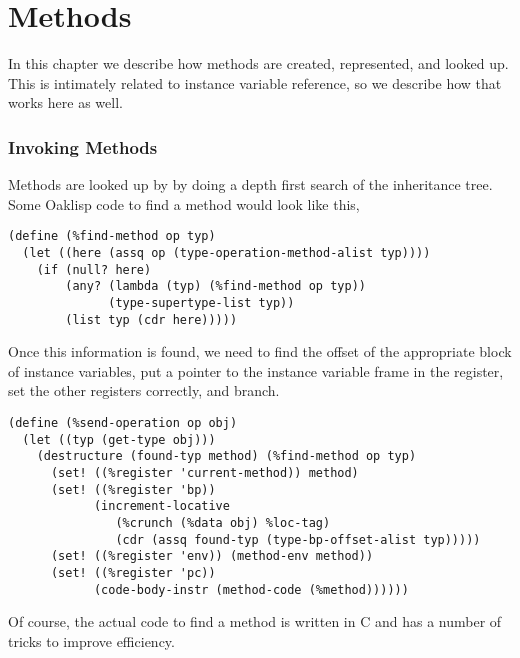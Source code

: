 \chapter{Methods}

In this chapter we describe how methods are created, represented, and
looked up.  This is intimately related to instance variable reference,
so we describe how that works here as well.

\subsection{Invoking Methods}

Methods are looked up by by doing a depth first search of the
inheritance tree.  Some Oaklisp code to find a method would look like
this,
\begin{verbatim}
(define (%find-method op typ)
  (let ((here (assq op (type-operation-method-alist typ))))
    (if (null? here)
        (any? (lambda (typ) (%find-method op typ))
              (type-supertype-list typ))
        (list typ (cdr here)))))
\end{verbatim}
Once this information is found, we need to find the offset of the
appropriate block of instance variables, put a pointer to the instance
variable frame in the  register, set the other registers
correctly, and branch.
\begin{verbatim}
(define (%send-operation op obj)
  (let ((typ (get-type obj)))
    (destructure (found-typ method) (%find-method op typ)
      (set! ((%register 'current-method)) method)
      (set! ((%register 'bp))
            (increment-locative
               (%crunch (%data obj) %loc-tag)
               (cdr (assq found-typ (type-bp-offset-alist typ)))))
      (set! ((%register 'env)) (method-env method))
      (set! ((%register 'pc))
            (code-body-instr (method-code (%method))))))
\end{verbatim}

Of course, the actual code to find a method is written in C and has a
number of tricks to improve efficiency.

